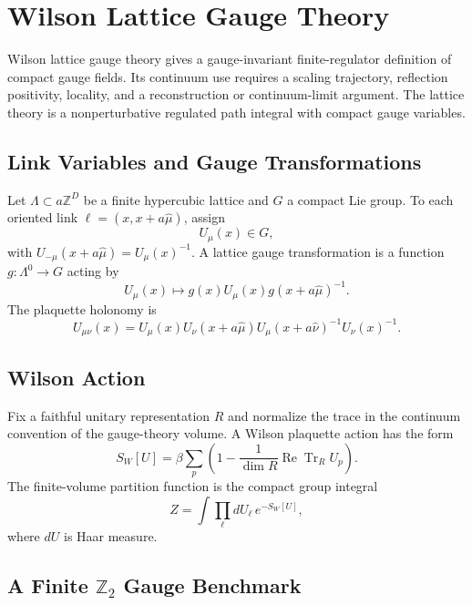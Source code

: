 \chapter{Wilson Lattice Gauge Theory}
\label{ch:constructive-wilson-lattice-gauge-theory}

\ConventionsEuclidean

Wilson lattice gauge theory gives a gauge-invariant finite-regulator
definition of compact gauge fields.  Its continuum use requires a scaling
trajectory, reflection positivity, locality, and a reconstruction or
continuum-limit argument.  The lattice theory is a nonperturbative regulated
path integral with compact gauge variables.

\section{Link Variables and Gauge Transformations}

Let \(\Lambda\subset a\mathbb Z^D\) be a finite hypercubic lattice and \(G\)
a compact Lie group.  To each oriented link \(\ell=(x,x+a\hat\mu)\), assign
\[
  U_\mu(x)\in G,
\]
with \(U_{-\mu}(x+a\hat\mu)=U_\mu(x)^{-1}\).  A lattice gauge transformation
is a function \(g:\Lambda^0\to G\) acting by
\[
  U_\mu(x)\mapsto g(x)U_\mu(x)g(x+a\hat\mu)^{-1}.
\]
The plaquette holonomy is
\[
  U_{\mu\nu}(x)
  =
  U_\mu(x)U_\nu(x+a\hat\mu)
  U_\mu(x+a\hat\nu)^{-1}U_\nu(x)^{-1}.
\]

\section{Wilson Action}

Fix a faithful unitary representation \(R\) and normalize the trace in the
continuum convention of the gauge-theory volume.  A Wilson plaquette action
has the form
\[
  S_W[U]
  =
  \beta\sum_{p}
  \left(
  1-\frac{1}{\dim R}\operatorname{Re}\operatorname{Tr}_R U_p
  \right).
\]
The finite-volume partition function is the compact group integral
\[
  Z=\int\prod_{\ell}dU_\ell\,e^{-S_W[U]},
\]
where \(dU\) is Haar measure.

\section{A Finite \texorpdfstring{\(\mathbb Z_2\)}{Z2} Gauge Benchmark}

